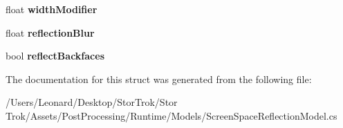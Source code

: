 \begin{DoxyCompactItemize}
float {\bfseries width\+Modifier}
\item 
\mbox{\label{struct_unity_engine_1_1_post_processing_1_1_screen_space_reflection_model_1_1_reflection_settings_a5d0f0e42f7a47b7054f09add92c5a1d4}} 
float {\bfseries reflection\+Blur}
\item 
\mbox{\label{struct_unity_engine_1_1_post_processing_1_1_screen_space_reflection_model_1_1_reflection_settings_aea5f2791fe328b408dca33c78e741dd4}} 
bool {\bfseries reflect\+Backfaces}
\end{DoxyCompactItemize}


The documentation for this struct was generated from the following file\+:\begin{DoxyCompactItemize}
\item 
/\+Users/\+Leonard/\+Desktop/\+Stor\+Trok/\+Stor Trok/\+Assets/\+Post\+Processing/\+Runtime/\+Models/Screen\+Space\+Reflection\+Model.\+cs\end{DoxyCompactItemize}
